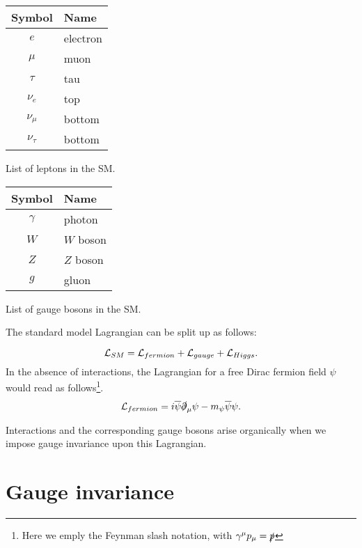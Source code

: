 \begin{margintable}[-3cm]
  \centering
\begin{tabular}{c|l}
    Symbol & Name \\
  \hline
    $e$ & electron\\
    $\mu$ & muon \\
    $\tau$ & tau \\
    $\nu_e$ & top \\
    $\nu_\mu$ & bottom \\
    $\nu_\tau$ & bottom \\
  \end{tabular}
  \caption{List of leptons in the SM.}
  \label{tab:leptons}
\end{margintable}

\begin{margintable}
  \centering
\begin{tabular}{c|l}
    Symbol & Name \\
  \hline
    $\gamma$ & photon\\
    $W$ & $W$ boson \\
    $Z$ & $Z$ boson \\
    $g$ & gluon \\
  \end{tabular}
  \caption{List of gauge bosons in the SM.}
  \label{tab:gaugebosons}
\end{margintable}

The standard model Lagrangian can be split up as follows:

$$\mathcal{L}_{SM} = \mathcal{L}_{fermion}+\mathcal{L}_{gauge}+\mathcal{L}_{Higgs}.$$
In the absence of interactions, the Lagrangian for a free Dirac fermion field $\psi$ would read as follows\footnote{Here we emply the Feynman slash notation, with $\gamma^\mu p_\mu = \slashed{p}$}.
\begin{align}
\mathcal{L}_{fermion} = i\overline{\psi}\slashed{\partial}_\mu\psi-m_{\psi}\overline{\psi}\psi.
\label{eq:fermion_lagrangian}
\end{align}

Interactions and the corresponding gauge bosons arise organically when we impose gauge invariance upon this Lagrangian.

\section{Gauge invariance}

